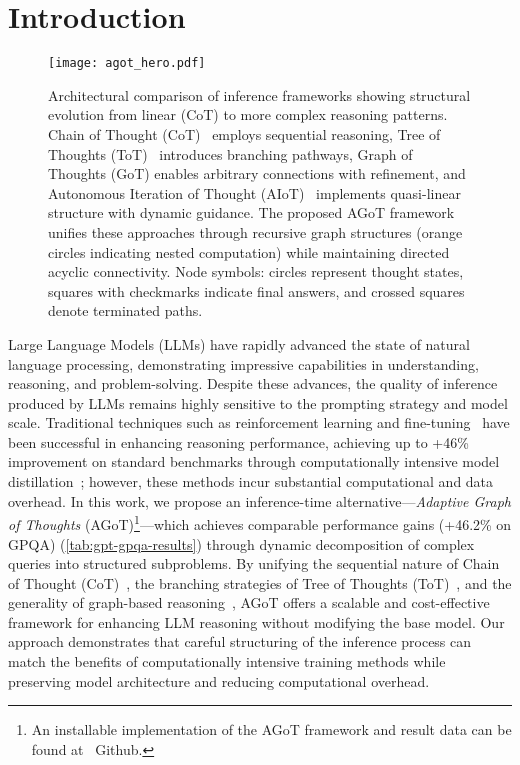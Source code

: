 \documentclass{article}
\begin{document}
\section{Introduction}
\begin{figure*}[!htb]
    \centering
    \texttt{[image: agot\_hero.pdf]}
    \caption{Architectural comparison of inference frameworks showing structural evolution from linear (CoT) to more complex reasoning patterns. Chain of Thought (CoT)~\citep{wei2022chain} employs sequential reasoning, Tree of Thoughts (ToT)~\citep{yao2024tree} introduces branching pathways, Graph of Thoughts (GoT) enables arbitrary connections with refinement, and Autonomous Iteration of Thought (AIoT)~\citep{radha2024iterationthoughtleveraginginner} implements quasi-linear structure with dynamic guidance. The proposed AGoT framework unifies these approaches through recursive graph structures (orange circles indicating nested computation) while maintaining directed acyclic connectivity. Node symbols: circles represent thought states, squares with checkmarks indicate final answers, and crossed squares denote terminated paths.}
    \label{fig:agot-hero}
\end{figure*}
Large Language Models (LLMs) have rapidly advanced the state of natural language processing, demonstrating impressive capabilities in understanding, reasoning, and problem-solving. Despite these advances, the quality of inference produced by LLMs remains highly sensitive to the prompting strategy and model scale. Traditional techniques such as reinforcement learning and fine-tuning~\citep{dubey2024llama, openai2024o1} have been successful in enhancing reasoning performance, achieving up to +46\% improvement on standard benchmarks through computationally intensive model distillation~\citep{deepseekai2025deepseekr1incentivizingreasoningcapability}; however, these methods incur substantial computational and data overhead. In this work, we propose an inference-time alternative—\emph{Adaptive Graph of Thoughts} (AGoT)\footnote{An installable implementation of the AGoT framework and result data can be found at~\citep{multi_agent_llm_2024} Github.}—which achieves comparable performance gains (+46.2\% on GPQA) (\cref{tab:gpt-gpqa-results}) through dynamic decomposition of complex queries into structured subproblems. By unifying the sequential nature of Chain of Thought (CoT)~\citep{wei2022chain}, the branching strategies of Tree of Thoughts (ToT)~\citep{yao2024tree}, and the generality of graph-based reasoning~\citep{besta2024graph}, AGoT offers a scalable and cost-effective framework for enhancing LLM reasoning without modifying the base model. Our approach demonstrates that careful structuring of the inference process can match the benefits of computationally intensive training methods while preserving model architecture and reducing computational overhead.
\end{document}
